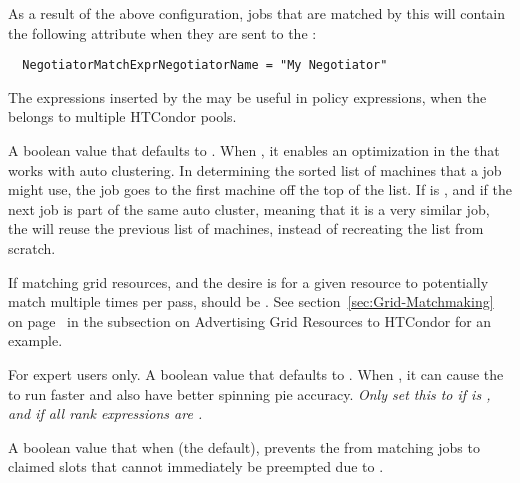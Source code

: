 \begin{description}
  As a result of the above configuration, jobs that are matched by this
   will contain the following attribute when they are 
  sent to the :

\footnotesize
\begin{verbatim}
  NegotiatorMatchExprNegotiatorName = "My Negotiator"
\end{verbatim}
\normalsize

  The expressions inserted by the  may be useful in 
   policy expressions,
  when the  belongs to multiple HTCondor pools.

\label{param:NegotiatorMatchlistCaching}
\item[\Macro{NEGOTIATOR\_MATCHLIST\_CACHING}]
  A boolean value that defaults to .
  When , it enables an optimization in the 
  that works with auto clustering.
  In determining the sorted list of machines that a job might use,
  the job goes to the first machine off the top of the list. 
  If  is ,
  and if the next job is part of the same auto cluster,
  meaning that it is a very similar job,
  the  will reuse the previous list of machines,
  instead of recreating the list from scratch.

  If matching grid resources, and the desire is for a
  given resource to potentially match multiple times per 
  pass,  should be .
  See section~\ref{sec:Grid-Matchmaking} on page~\pageref{sec:Grid-Matchmaking}
  in the subsection on Advertising Grid Resources to HTCondor for an example.

\label{param:NegotiatorConsiderPreemption}
\item[\Macro{NEGOTIATOR\_CONSIDER\_PREEMPTION}]
  For expert users only. A boolean value that defaults to .
  When ,
  it can cause the  to run
  faster and also have better spinning pie accuracy.
  \emph{Only set this to  if 
  is ,
  and if all  rank expressions are .}

\label{param:NegotiatorConsiderEarlyPreemption}
\item[\Macro{NEGOTIATOR\_CONSIDER\_EARLY\_PREEMPTION}]
  A boolean value that when  (the default),
  prevents the  from matching jobs
  to claimed slots that cannot immediately be preempted
  due to .


\end{description}
